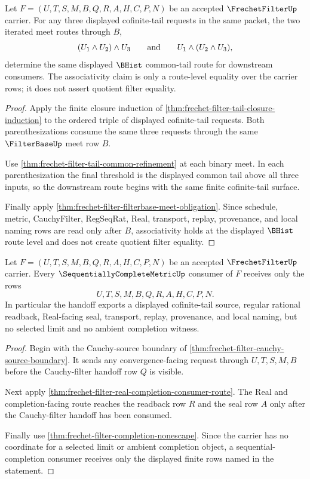 \begin{theorem}
\label{thm:frechet-filter-cofinite-meet-associativity}
Let $F=(U,T,S,M,B,Q,R,A,H,C,P,N)$ be an accepted $\FrechetFilterUp$ carrier. For any three displayed cofinite-tail requests in the same packet, the two iterated meet routes through $B$,
$$
(U_1 \wedge U_2)\wedge U_3
\qquad\hbox{and}\qquad
U_1\wedge (U_2 \wedge U_3),
$$
determine the same displayed $\BHist$ common-tail route for downstream consumers. The associativity claim is only a route-level equality over the carrier rows; it does not assert quotient filter equality.
\end{theorem}
\begin{proof}
Apply the finite closure induction of \autoref{thm:frechet-filter-tail-closure-induction} to the ordered triple of displayed cofinite-tail requests. Both parenthesizations consume the same three requests through the same $\FilterBaseUp$ meet row $B$.

Use \autoref{thm:frechet-filter-tail-common-refinement} at each binary meet. In each parenthesization the final threshold is the displayed common tail above all three inputs, so the downstream route begins with the same finite cofinite-tail surface.

Finally apply \autoref{thm:frechet-filter-filterbase-meet-obligation}. Since schedule, metric, CauchyFilter, RegSeqRat, Real, transport, replay, provenance, and local naming rows are read only after $B$, associativity holds at the displayed $\BHist$ route level and does not create quotient filter equality.
\end{proof}

\begin{theorem}
\label{thm:frechet-filter-sequential-completion-handoff}
Let $F=(U,T,S,M,B,Q,R,A,H,C,P,N)$ be an accepted $\FrechetFilterUp$ carrier. Every $\SequentiallyCompleteMetricUp$ consumer of $F$ receives only the rows
$$
U,T,S,M,B,Q,R,A,H,C,P,N .
$$
In particular the handoff exports a displayed cofinite-tail source, regular rational readback, Real-facing seal, transport, replay, provenance, and local naming, but no selected limit and no ambient completion witness.
\end{theorem}
\begin{proof}
Begin with the Cauchy-source boundary of \autoref{thm:frechet-filter-cauchy-source-boundary}. It sends any convergence-facing request through $U,T,S,M,B$ before the Cauchy-filter handoff row $Q$ is visible.

Next apply \autoref{thm:frechet-filter-real-completion-consumer-route}. The Real and completion-facing route reaches the readback row $R$ and the seal row $A$ only after the Cauchy-filter handoff has been consumed.

Finally use \autoref{thm:frechet-filter-completion-nonescape}. Since the carrier has no coordinate for a selected limit or ambient completion object, a sequential-completion consumer receives only the displayed finite rows named in the statement.
\end{proof}

